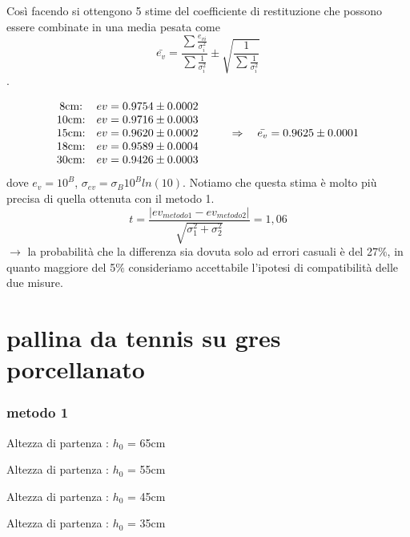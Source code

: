 \documentclass[a4paper]{article}
\theoremstyle{definition}
\begin{document}
	\noindent Così facendo si ottengono 5 stime del coefficiente di restituzione che possono essere combinate in una media pesata come \[\bar{e_{v}}=\frac{\sum\frac{e_{vi}}{\sigma_{i}^{2}}}{\sum\frac{1}{\sigma _{i}^{2}}} \pm \sqrt{\frac{1}{\sum \frac{1}{\sigma _{i}^{2}}}}\].
	
	\[\begin{matrix}
		$8cm:$ & $\(ev = 0.9754 \pm 0.0002\)$ &  \\ 
		$10cm:$ & $\(ev = 0.9716 \pm 0.0003\)$ &  \\ 
		$15cm:$ & $\(ev = 0.9620 \pm 0.0002\)$ & $\(\qquad \Rightarrow \quad \bar{e_{v}} = 0.9625 \pm 0.0001\)$\\ 
		$18cm:$ & $\(ev = 0.9589 \pm 0.0004\)$ &  \\ 
		$30cm:$ & $\(ev = 0.9426 \pm 0.0003\)$ & 
	\end{matrix}\]
	dove \(e_{v}= 10^{B}\), \(\sigma_{ev} = \sigma_{B}10^{B}ln(10)\). Notiamo che questa stima è molto più precisa di quella ottenuta con il metodo 1.\\
	\[t = \frac{ \left |ev_{metodo1}  - ev_{metodo2} \right |}{\sqrt{\sigma_{1}^{2}+ \sigma_{2}^{2}}} = 1,06  \]
	\noindent \(\rightarrow\) la probabilità che la differenza sia dovuta solo ad errori casuali è del 27\(\%\), in quanto maggiore del 5\(\%\) consideriamo accettabile l'ipotesi di compatibilità delle due misure.
	\section*{pallina da tennis su gres porcellanato}
	\subsubsection*{metodo 1}
	Altezza di partenza : \(h_{0}\) = 65cm
	
	\begin{table}[!ht]
		\centering
		
	\end{table}
		\noindent Altezza di partenza : \(h_{0}\) = 55cm
		
	\begin{table}[!ht]
		\centering
		
	\end{table}
	\noindent	Altezza di partenza : \(h_{0}\) = 45cm
		
	\begin{table}[!ht]
		\centering
		
	\end{table}
	\noindent	Altezza di partenza : \(h_{0}\) = 35cm
		
\end{document}
